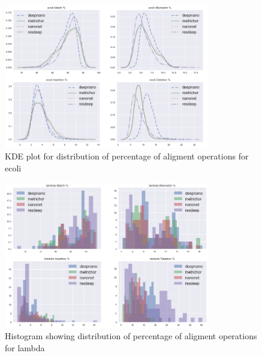 \documentclass[times, utf8, diplomski, numeric, english]{fer}
\begin{document}
\begin{figure}[!htb]
	\begin{center}
		\includegraphics[width=0.8\textwidth]{./imgs/results/ecoli/kde_cigar_lines.png}
		\caption{KDE plot for distribution of percentage of aligment operations for ecoli}
		\label{fg:ecoli_kde}
	\end{center}
\end{figure}

\begin{figure}[!htb]
	\begin{center}
		\includegraphics[width=0.8\textwidth]{./imgs/results/lambda/hist_20.png}
		\caption{Histogram showing distribution of percentage of aligment operations for lambda}
		\label{fg:hist}
	\end{center}
\end{figure}
\end{document}
